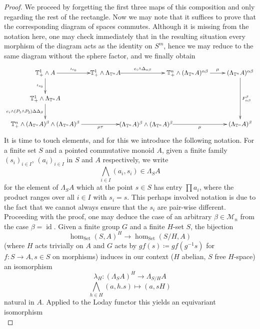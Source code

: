 \documentclass[10pt, a4paper, UKenglish]{article}
\numberwithin{equation}{section}
\newcommand{\cM}{\mathcal{M}}
\newcommand{\sT}{\mathbb{T}}		%
\newcommand{\defas}{\coloneqq}  %
\newcommand{\abs}[1]{\left\vert#1\right\vert}	%
\newcommand{\id}{\operatorname{id}}
\renewcommand{\hom}{\operatorname{hom}}
\theoremstyle{plain}
\theoremstyle{definition}
\renewcommand{\to}{\longrightarrow}
\renewcommand{\mapsto}{\longmapsto}
\newcommand{\Set}{\mathrm{Set}}
\begin{document}
\begin{proof}
We proceed by forgetting the first three maps of this composition and only regarding the rest of the rectangle. Now we may note that it suffices to prove that the corresponding diagram of spaces commutes. Although it is missing from the notation here, one may check immediately that in the resulting situation every morphism of the diagram acts as the identity on $S^m$, hence we may reduce to the same diagram without the sphere factor, and we finally obtain
\begin{equation*}
\xymatrix{
	\sT^1_+ \wedge A%
		\ar[r]^-{\iota_{c_0}}
		\ar[d]_-{\iota_{c_0}}
	&
	*!(10,0){\sT^1_+ \wedge \Lambda_{\sT^n} A}%
		\ar[r]^-{e_i \wedge \Delta_{\alpha\beta}}%
	&
	\sT^n_+ \wedge (\Lambda_{\sT^n} A)^{\alpha\beta}
		\ar[r]^-{\mu}%
	&
	(\Lambda_{\sT^n} A)^{\alpha\beta}
		\ar[dd]^{F_{\alpha\beta}^\beta}%
	\\%
	\sT^1_+ \wedge \Lambda_{\sT^n} A%
		\ar[d]_{e_i \wedge ( P_1 \wedge P_2) \Delta \Delta_\beta }%
	&
	&
	&
	\\%
	\sT^n_+ \wedge (\Lambda_{\sT^n} A)^\beta \wedge (\Lambda_{\sT^n} A)^\beta%
		\ar[r]_-{\mu \tau}%
	&
	*!(-13,0){(\Lambda_{\sT^n} A)^\beta \wedge (\Lambda_{\sT^n} A)^\beta}%
		\ar[rr]_-{\mu}%
	&
	&
	(\Lambda_{\sT^n} A)^\beta
}
\end{equation*}
It is time to touch elements, and for this we introduce the following notation. For a finite set $S$ and a pointed commutative monoid $A$, given a finite family $(s_i)_{i \in I}$, $(a_i)_{i \in I}$ in $S$ and $A$ respectively, we write
	\[ \bigwedge_{i \in I} (a_i, s_i) \in \Lambda_S A 	\]
for the element of $\Lambda_S A$ which at the point $s \in S$ has entry $\prod a_i$, where the product ranges over all $i \in I$ with $s_i = s$. This perhaps involved notation is due to the fact that we cannot always ensure that the $s_i$ are pair-wise different.\\
Proceeding with the proof, one may deduce the case of an arbitrary $\beta \in \cM_n$ from the case $\beta = \id$. Given a finite group $G$ and a finite $H$-set $S$, the bijection
	\[ \hom_{\Set} (S,A)^{H} \to \hom_{\Set} (S/H,A)\]
(where $H$ acts trivially on $A$ and $G$ acts by $g f(s) \defas gf(g^{-1}s)$ for $f:S \to A, s \in S$ on morphisms) induces in our context ($H$ abelian, $S$ free $H$-space) an isomorphism
	\[ \lambda_H: ( \Lambda_{S} A )^H \to \Lambda_{S / H} A \]
	\[	\bigwedge_{h \in H} (a,h . s) \mapsto (a,sH) \]
natural in $A$. Applied to the Loday functor this yields an equivariant isomorphism
\begin{equation*}

\end{equation*}
\end{proof}
\end{document}
